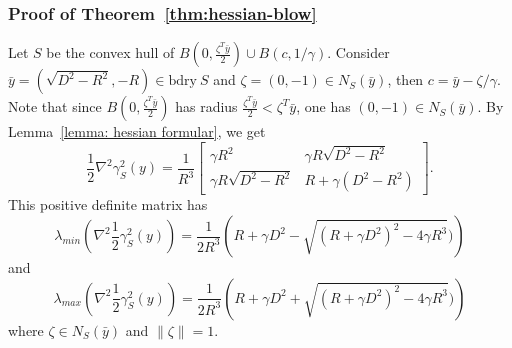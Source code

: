 \documentclass[sn-mathphys,Numbered]{sn-jnl}%
\newcommand{\bdry}{\mathrm{bdry\ }}
\begin{document}
\subsubsection{Proof of Theorem~\ref{thm:hessian-blow}} \label{proof:hessian-blow}
Let $S$ be the convex hull of $B(0,\frac{\zeta^T\bar y}{2}) \cup B(c, 1/\gamma)$. Consider $\bar y =(\sqrt{D^2-R^2}, -R) \in \bdry S$ and $\zeta =(0,-1) \in N_S(\bar y)$, then $c=\bar y - \zeta/\gamma $. Note that since $B(0,\frac{\zeta^T\bar y}{2})$ has radius $\frac{\zeta^T \bar y}{2}<\zeta ^T\bar y$, one has $(0,-1) \in N_S(\bar y)$. By Lemma~\ref{lemma: hessian formular}, we get 
$$ \frac{1}{2}\nabla^2 \gamma _S^2( y) = \frac{1}{R^3}\begin{bmatrix} \gamma R^2 & \gamma R\sqrt{D^2-R^2} \\ \gamma R\sqrt{D^2-R^2} & R+\gamma (D^2-R^2) \end{bmatrix}. 
$$
This positive definite matrix has 
$$\lambda_{min}(\nabla^2 \frac{1}{2}\gamma^2_S(y)) =\frac{1}{2R^3}\left(R+\gamma D^2-\sqrt{(R+\gamma D^2)^2-4\gamma R^3})\right)
$$
and
$$\lambda_{max}(\nabla^2 \frac{1}{2}\gamma^2_S(y)) =\frac{1}{2R^3}\left(R+\gamma D^2+\sqrt{(R+\gamma D^2)^2-4\gamma R^3})\right)
$$
where $\zeta \in N_S(\bar y)$ and $\|\zeta\| =1$.

    
\end{document}
